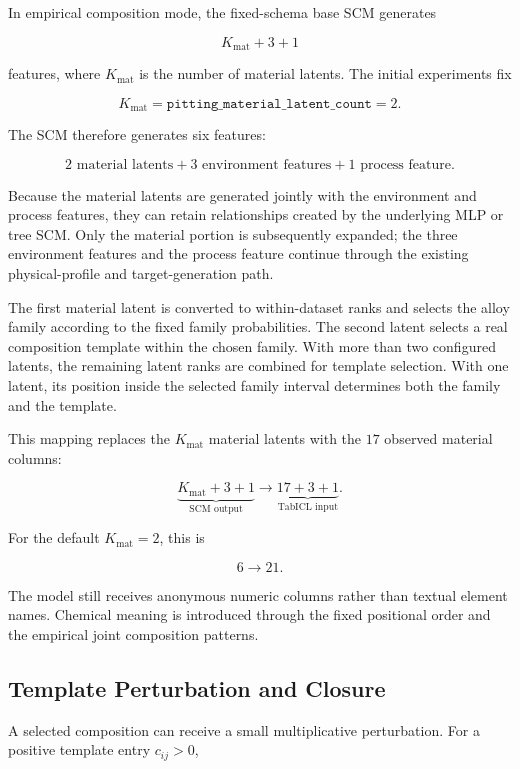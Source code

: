 \documentclass{article}
\begin{document}
In empirical composition mode, the fixed-schema base SCM generates

\[
K_{\mathrm{mat}}
+
3
+
1
\]

features, where \(K_{\mathrm{mat}}\) is the number of material latents. The
initial experiments fix

\[
K_{\mathrm{mat}}
=
\texttt{pitting\_material\_latent\_count}
=
2.
\]

The SCM therefore generates six features:

\[
2 \text{ material latents}
+
3 \text{ environment features}
+
1 \text{ process feature}.
\]

Because the material latents are generated jointly with the environment and
process features, they can retain relationships created by the underlying MLP
or tree SCM. Only the material portion is subsequently expanded; the three
environment features and the process feature continue through the existing
physical-profile and target-generation path.

The first material latent is converted to within-dataset ranks and selects the
alloy family according to the fixed family probabilities. The second latent
selects a real composition template within the chosen family. With more than two
configured latents, the remaining latent ranks are combined for template
selection. With one latent, its position inside the selected family interval
determines both the family and the template.

This mapping replaces the \(K_{\mathrm{mat}}\) material latents with the \(17\)
observed material columns:

\[
\underbrace{
K_{\mathrm{mat}}+3+1
}_{\text{SCM output}}
\longrightarrow
\underbrace{
17+3+1
}_{\text{TabICL input}}.
\]

For the default \(K_{\mathrm{mat}}=2\), this is

\[
6
\longrightarrow
21.
\]

The model still receives anonymous numeric columns rather than textual element
names. Chemical meaning is introduced through the fixed positional order and
the empirical joint composition patterns.

\subsection{Template Perturbation and Closure}

A selected composition can receive a small multiplicative perturbation. For a
positive template entry \(c_{ij}>0\),
\end{document}
